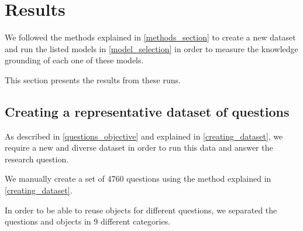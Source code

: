 \section{Results}

We followed the methods explained in \cref{methods_section} to create a new dataset and run the listed models in \cref{model_selection} in order to measure the knowledge grounding of each one of these models.

This section presents the results from these runs.

\subsection{Creating a representative dataset of questions}
\label{dataset_results}

As described in \cref{questions_objective} and explained in \cref{creating_dataset}, we require a new and diverse dataset in order to run this data and answer the research question.

We manually create a set of 4760 questions using the method explained in \cref{creating_dataset}.

In order to be able to reuse objects for different questions, we separated the questions and objects in 9 different categories.

